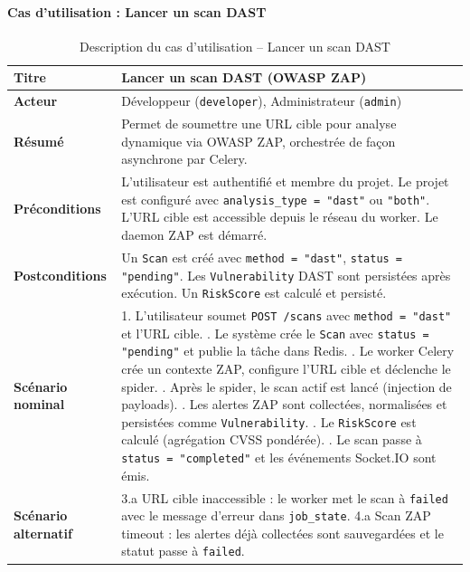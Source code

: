 \paragraph{Cas d'utilisation : Lancer un scan DAST}
\begin{table}[H]
\centering
\caption{Description du cas d'utilisation -- Lancer un scan DAST}
\label{tab:uc-dast}
\small
\renewcommand{\arraystretch}{1.3}
\begin{tabularx}{\textwidth}{>{\bfseries}p{3.5cm} X}
\hline
Titre & Lancer un scan DAST (OWASP ZAP) \\
\hline
Acteur & Développeur (\texttt{developer}), Administrateur (\texttt{admin}) \\
\hline
Résumé & Permet de soumettre une URL cible pour analyse dynamique via OWASP ZAP, orchestrée de façon asynchrone par Celery. \\
\hline
Préconditions & L'utilisateur est authentifié et membre du projet. Le projet est configuré avec \texttt{analysis\_type = "dast"} ou \texttt{"both"}. L'URL cible est accessible depuis le réseau du worker. Le daemon ZAP est démarré. \\
\hline
Postconditions & Un \texttt{Scan} est créé avec \texttt{method = "dast"}, \texttt{status = "pending"}. Les \texttt{Vulnerability} DAST sont persistées après exécution. Un \texttt{RiskScore} est calculé et persisté. \\
\hline
Scénario nominal &
1. L'utilisateur soumet \texttt{POST /scans} avec \texttt{method = "dast"} et l'URL cible. \newline
2. Le système crée le \texttt{Scan} avec \texttt{status = "pending"} et publie la tâche dans Redis. \newline
3. Le worker Celery crée un contexte ZAP, configure l'URL cible et déclenche le spider. \newline
4. Après le spider, le scan actif est lancé (injection de payloads). \newline
5. Les alertes ZAP sont collectées, normalisées et persistées comme \texttt{Vulnerability}. \newline
6. Le \texttt{RiskScore} est calculé (agrégation CVSS pondérée). \newline
7. Le scan passe à \texttt{status = "completed"} et les événements Socket.IO sont émis. \\
\hline
Scénario alternatif &
3.a URL cible inaccessible : le worker met le scan à \texttt{failed} avec le message d'erreur dans \texttt{job\_state}. \newline
4.a Scan ZAP timeout : les alertes déjà collectées sont sauvegardées et le statut passe à \texttt{failed}. \\
\hline
\end{tabularx}
\end{table}

